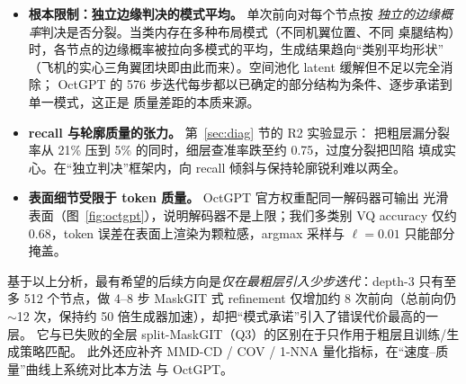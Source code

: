 \documentclass{article}
\begin{document}
\begin{itemize}
    \item \textbf{根本限制：独立边缘判决的模式平均。} 单次前向对每个节点按
    \emph{独立的边缘概率}判决是否分裂。当类内存在多种布局模式（不同机翼位置、不同
    桌腿结构）时，各节点的边缘概率被拉向多模式的平均，生成结果趋向``类别平均形状''
    （飞机的实心三角翼团块即由此而来）。空间池化 latent 缓解但不足以完全消除；
    OctGPT 的 576 步迭代每步都以已确定的部分结构为条件、逐步承诺到单一模式，这正是
    质量差距的本质来源。
    \item \textbf{recall 与轮廓质量的张力。} 第~\ref{sec:diag} 节的 R2 实验显示：
    把粗层漏分裂率从 21\% 压到 5\% 的同时，细层查准率跌至约 0.75，过度分裂把凹陷
    填成实心。在``独立判决''框架内，向 recall 倾斜与保持轮廓锐利难以两全。
    \item \textbf{表面细节受限于 token 质量。} OctGPT 官方权重配同一解码器可输出
    光滑表面（图~\ref{fig:octgpt}），说明解码器不是上限；我们多类别 VQ accuracy
    仅约 0.68，token 误差在表面上渲染为颗粒感，argmax 采样与 $\ell=0.01$ 只能部分
    掩盖。
\end{itemize}

基于以上分析，最有希望的后续方向是\emph{仅在最粗层引入少步迭代}：depth-3 只有至多
512 个节点，做 4--8 步 MaskGIT 式 refinement 仅增加约 8 次前向（总前向仍
$\sim$12 次，保持约 50 倍生成器加速），却把``模式承诺''引入了错误代价最高的一层。
它与已失败的全层 split-MaskGIT（Q3）的区别在于只作用于粗层且训练/生成策略匹配。
此外还应补齐 MMD-CD / COV / 1-NNA 量化指标，在``速度--质量''曲线上系统对比本方法
与 OctGPT。
\end{document}
